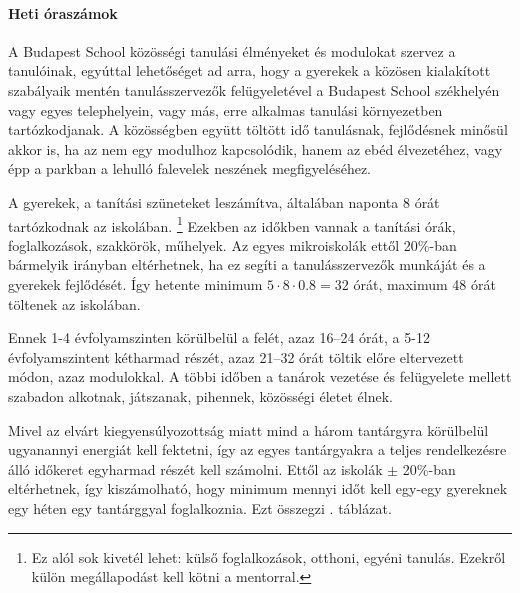 \paragraph{Heti óraszámok}

A Budapest School közösségi tanulási élményeket és modulokat szervez a
tanulóinak, egyúttal lehetőséget ad arra, hogy a gyerekek a közösen kialakított
szabályaik mentén tanulásszervezők felügyeletével a Budapest School székhelyén
vagy egyes telephelyein, vagy más, erre alkalmas tanulási környezetben
tartózkodjanak. A közösségben együtt töltött idő tanulásnak, fejlődésnek
minősül akkor is, ha az nem egy modulhoz kapcsolódik, hanem az ebéd
élvezetéhez, vagy épp a parkban a lehulló falevelek neszének megfigyeléséhez.

A gyerekek, a tanítási szüneteket leszámítva, általában naponta 8 órát
tartózkodnak az
iskolában. \footnote{Ez alól sok kivetél lehet: külső foglalkozások, otthoni,
  egyéni tanulás. Ezekről külön megállapodást kell kötni a mentorral.} Ezekben az
időkben vannak a tanítási órák, foglalkozások, szakkörök,
műhelyek. Az egyes mikroiskolák ettől 20\%-ban bármelyik irányban eltérhetnek,
ha ez segíti a tanulásszervezők munkáját és a gyerekek fejlődését. Így hetente
minimum $5 \cdot 8 \cdot 0.8 = 32$ órát, maximum 48 órát töltenek az iskolában.

Ennek 1-4 évfolyamszinten körülbelül a felét, azaz 16--24 órát, a 5-12 évfolyamszintent  kétharmad részét, azaz 21--32 órát
töltik előre eltervezett módon, azaz modulokkal. A többi időben a tanárok
vezetése és felügyelete mellett szabadon alkotnak, játszanak, pihennek,
közösségi életet élnek.

Mivel az elvárt kiegyensúlyozottság miatt mind a három tantárgyra körülbelül
ugyanannyi energiát kell fektetni, így az egyes tantárgyakra a teljes
rendelkezésre álló időkeret egyharmad részét kell számolni. Ettől az iskolák
$\pm$ 20\%-ban eltérhetnek, így kiszámolható, hogy minimum mennyi időt kell
egy-egy gyereknek egy héten egy tantárggyal foglalkoznia. Ezt összegzi
. táblázat.

